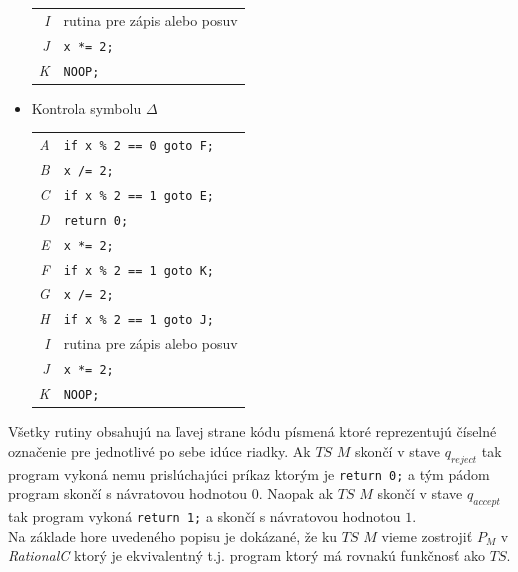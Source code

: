 \documentclass[11pt,a4paper]{article}
\begin{document}
\begin{itemize}
\begin{flushright}
\begin{minipage}{0.90\textwidth}
\begin{tabular}{r|l}
                \textit{I} & rutina pre zápis alebo posuv\\
                \textit{J} & \texttt{x *= 2;}\\
                \textit{K} & \texttt{NOOP;}
            \end{tabular}
        \end{minipage}
        \end{flushright}
    \item Kontrola symbolu $\Delta$
        \begin{flushright}
        \begin{minipage}{0.90\textwidth}
            \begin{tabular}{r|l}
                \textit{A} & \texttt{if x \% 2 == 0 goto F;}\\
                \textit{B} & \texttt{x /= 2;}\\
                \textit{C} & \texttt{if x \% 2 == 1 goto E;}\\
                \textit{D} & \texttt{return 0;}\\
                \textit{E} & \texttt{x *= 2;}\\
                \textit{F} & \texttt{if x \% 2 == 1 goto K;}\\
                \textit{G} & \texttt{x /= 2;}\\
                \textit{H} & \texttt{if x \% 2 == 1 goto J;}\\
                \textit{I} & rutina pre zápis alebo posuv\\
                \textit{J} & \texttt{x *= 2;}\\
                \textit{K} & \texttt{NOOP;}
            \end{tabular}
        \end{minipage}
        \end{flushright}
\end{itemize}

Všetky rutiny obsahujú na ľavej strane kódu písmená ktoré reprezentujú číselné označenie pre jednotlivé po sebe idúce riadky. Ak $TS$ $M$ skončí v stave $q_{reject}$ tak program vykoná nemu prislúchajúci príkaz ktorým je \texttt{return 0;} a tým pádom program skončí s návratovou hodnotou $0$. Naopak ak $TS$ $M$ skončí v stave $q_{accept}$ tak program vykoná \texttt{return 1;} a skončí s návratovou hodnotou $1$.\\

Na základe hore uvedeného popisu je dokázané, že ku $TS$ $M$ vieme zostrojiť $P_M$ v \textit{RationalC} ktorý je ekvivalentný t.j. program ktorý má rovnakú funkčnosť ako $TS$.
\end{document}
